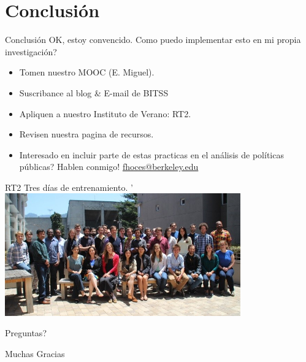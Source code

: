 \documentclass{beamer}
\begin{document}
\section{Conclusión}

\begin{frame}{Conclusión}
OK, estoy convencido. Como puedo implementar esto en mi propia investigación?

\begin{itemize}[<.->]
\item Tomen nuestro MOOC (E. Miguel).\href{https://www.futurelearn.com/courses/open-social-science-research}{}
\item Suscribance al blog \& E-mail de BITSS \href{https://bitss.org/blog}{}
\item Apliquen a nuestro Instituto de Verano: RT2. \href{http://www.bitss.org/events/summer-institute/}{}
\item Revisen nuestra pagina de recursos. \href{http://www.bitss.org/resource-tag/education/}{}
\item Interesado en incluir parte de estas practicas en el análisis de políticas públicas? Hablen conmigo! \href{mailto:fhoces@berkeley.edu}{fhoces@berkeley.edu}

\end{itemize}
\end{frame}

\begin{frame}{RT2}
Tres días de entrenamiento. 
'\includegraphics[width=4in]{../Images/bitss-2014-cohort2.jpg}
\end{frame}

\begin{frame}
\begin{center}
Preguntas?
\vspace{0.5in}


\Huge{Muchas Gracias}
\end{center}
\end{frame}
\end{document}
